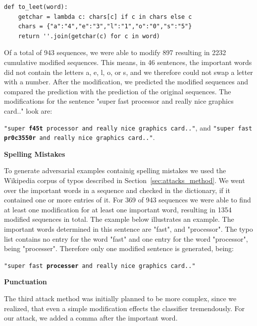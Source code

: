 \begin{lstlisting}
def to_leet(word):
    getchar = lambda c: chars[c] if c in chars else c
    chars = {"a":"4","e":"3","l":"1","o":"0","s":"5"}
    return ''.join(getchar(c) for c in word)
\end{lstlisting}
Of a total of 943 sequences, we were able to modify 897 resulting in 2232 cumulative modified sequences. This means, in 46 sentences, the important words did not contain the letters a, e, l, o, or s, and we therefore could not swap a letter with a number.
After the modification, we predicted the modified sequences and compared the prediction with the prediction of the original sequences. 
The modifications for the sentence "super fast processor and really nice graphics card.." look are:

\texttt{"super \textbf{f45t} processor and really nice graphics card.."}, and
\texttt{"super fast \textbf{pr0c3550r} and really nice graphics card.."}.


\textbf{Spelling Mistakes}

To generate adversarial examples containig spelling mistakes we used the Wikipedia corpus of typos described in Section~\ref{sec:attacks_method}. We went over the important words in a sequence and checked in the dictionary, if it contained one or more entries of it. For 369 of 943 sequences we were able to find at least one modification for at least one important word, resulting in 1354  modified sequences in total.
The example below illustrates an example. The important words determined in this sentence are "fast", and "processor". The typo list contains no entry for the word "fast" and one entry for the word "processor", being "processer". Therefore only one modified sentence is generated, being:

\texttt{"super fast \textbf{processer} and really nice graphics card.."}

\textbf{Punctuation}

The third attack method was initially planned to be more complex, since we realized, that even a simple modification effects the classifier tremendously. For our attack, we added a comma after the important word. 

